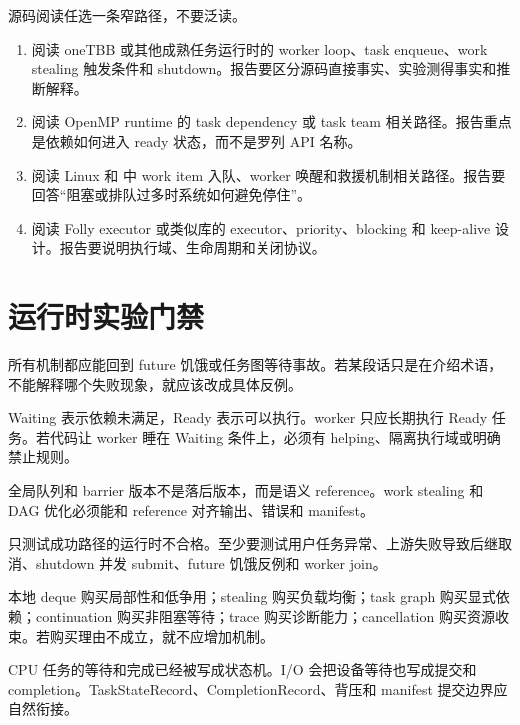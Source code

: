 \begin{sourcereadingbox}
源码阅读任选一条窄路径，不要泛读。

\begin{enumerate}
  \item 阅读 oneTBB 或其他成熟任务运行时的 worker loop、task enqueue、work stealing 触发条件和 shutdown。报告要区分源码直接事实、实验测得事实和推断解释。
  \item 阅读 OpenMP runtime 的 task dependency 或 task team 相关路径。报告重点是依赖如何进入 ready 状态，而不是罗列 API 名称。
  \item 阅读 Linux  和  中 work item 入队、worker 唤醒和救援机制相关路径。报告要回答“阻塞或排队过多时系统如何避免停住”。
  \item 阅读 Folly executor 或类似库的 executor、priority、blocking 和 keep-alive 设计。报告要说明执行域、生命周期和关闭协议。
\end{enumerate}
\end{sourcereadingbox}

\section{运行时实验门禁}

所有机制都应能回到 future 饥饿或任务图等待事故。若某段话只是在介绍术语，不能解释哪个失败现象，就应该改成具体反例。

Waiting 表示依赖未满足，Ready 表示可以执行。worker 只应长期执行 Ready 任务。若代码让 worker 睡在 Waiting 条件上，必须有 helping、隔离执行域或明确禁止规则。

全局队列和 barrier 版本不是落后版本，而是语义 reference。work stealing 和 DAG 优化必须能和 reference 对齐输出、错误和 manifest。

只测试成功路径的运行时不合格。至少要测试用户任务异常、上游失败导致后继取消、shutdown 并发 submit、future 饥饿反例和 worker join。

本地 deque 购买局部性和低争用；stealing 购买负载均衡；task graph 购买显式依赖；continuation 购买非阻塞等待；trace 购买诊断能力；cancellation 购买资源收束。若购买理由不成立，就不应增加机制。

CPU 任务的等待和完成已经被写成状态机。I/O 会把设备等待也写成提交和 completion。TaskStateRecord、CompletionRecord、背压和 manifest 提交边界应自然衔接。

